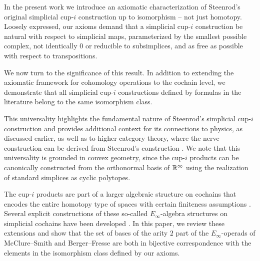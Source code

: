 In the present work we introduce an axiomatic characterization of Steenrod's original simplicial \mbox{cup-$i$} construction up to isomorphism -- not just homotopy.
Loosely expressed, our axioms demand that a simplicial \mbox{cup-$i$} construction be natural with respect to simplicial maps, parameterized by the smallest possible complex, not identically $0$ or reducible to subsimplices, and as free as possible with respect to transpositions.

We now turn to the significance of this result.
In addition to extending the axiomatic framework for cohomology operations \cite{serre1053eilenberg_maclane, cartan1955iteration, steenrod1962cohomology} to the cochain level, we demonstrate that all simplicial \mbox{cup-$i$} constructions defined by formulas in the literature \cite{steenrod1947products, real1996computability, mcclure2003multivariable, berger2004combinatorial, medina2020prop1, medina2023fast_sq} belong to the same isomorphism class.

This universality highlights the fundamental nature of Steenrod's simplicial \mbox{cup-$i$} construction and provides additional context for its connections to physics, as discussed earlier, as well as to higher category theory, where the nerve construction can be derived from Steenrod's construction \cite{street1987orientals, medina2020globular}.
We note that this universality is grounded in convex geometry, since the cup-$i$ products can be canonically constructed from the orthonormal basis of $\mathbb{R}^\infty$ using the realization of standard simplices as cyclic polytopes.

The cup-$i$ products are part of a larger algebraic structure on cochains that encodes the entire homotopy type of spaces with certain finiteness assumptions \cite{mandell2006homotopy_type}.
Several explicit constructions of these so-called $E_\infty$-algebra structures on simplicial cochains have been developed \cite{mcclure2003multivariable, berger2004combinatorial, medina2020prop1}.
In this paper, we review these extensions and show that the set of bases of the arity $2$ part of the $E_\infty$-operads of McClure--Smith and Berger--Fresse are both in bijective correspondence with the elements in the isomorphism class defined by our axioms.